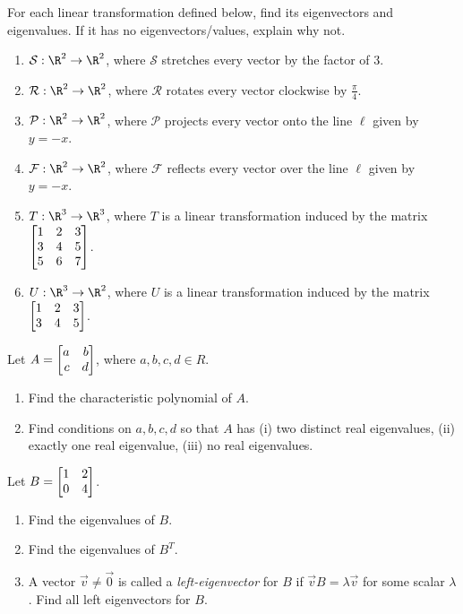 \begin{exercises}
	\begin{problist}
		\prob For each linear transformation defined below, find its
		eigenvectors and eigenvalues. If it has no eigenvectors/values,
		explain why not.
		\begin{enumerate}
			\item $\mathcal S:\R^{2}\to\R^{2}$, where $\mathcal S$
				stretches every
				vector by the factor of $3$.

			\item $\mathcal R:\R^{2}\to\R^{2}$, where $\mathcal R$  
				rotates every vector
				clockwise by $\frac{\pi}{4}$.

			\item $\mathcal P:\R^{2}\to\R^{2}$, where $\mathcal P$
				projects every vector
				onto the line $\ell$ given by $y=-x$.

			\item $\mathcal F:\R^{2}\to\R^{2}$, where $\mathcal F$
				reflects every
				vector over the line $\ell$ given by $y=-x$.

			\item $T:\R^{3}\to\R^{3}$, where $T$ is a linear
				transformation induced by the matrix
				$\mat{1&2&3\\3&4&5\\5&6&7}$.

			\item $U:\R^{3}\to\R^{2}$, where $U$ is a linear
				transformation induced by the matrix
				$\mat{1&2&3\\3&4&5}$.
		\end{enumerate}

		\prob Let $A = \mat{a&b\\c&d}$, where $a,b,c,d \in R$.
		\begin{enumerate}
			\item Find the characteristic polynomial of $A$.
		
			\item Find conditions on $a,b,c,d$ so that $A$ has (i) two distinct
				real eigenvalues, (ii) exactly one real eigenvalue, (iii) no
				real eigenvalues.
		\end{enumerate}

		\prob Let $B=\mat{1&2\\0&4}$.
		\begin{enumerate}
			\item Find the eigenvalues of $B$.
			\item Find the eigenvalues of $B^T$.
			\item A vector $\vec v\neq\vec 0$ is called a \emph{left-eigenvector} for $B$ if
				$\vec vB=\lambda \vec v$ for some scalar $\lambda$. Find all
				left eigenvectors for $B$.
		\end{enumerate}


\end{problist}
\end{exercises}
